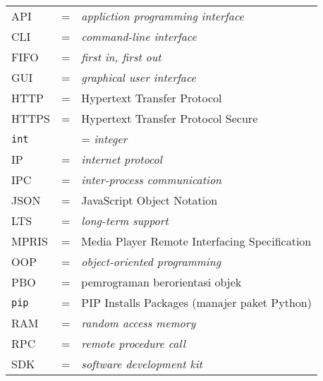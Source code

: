 \begin{tabular}{llp{3in}}
    API & \hspace{1.5cm} = & \textit{appliction programming interface}\\
    CLI & \hspace{1.5cm} = & \textit{command-line interface}\\
    FIFO & \hspace{1.5cm} = & \textit{first in, first out}\\
    GUI & \hspace{1.5cm} = & \textit{graphical user interface}\\
    HTTP & \hspace{1.5cm} = & Hypertext Transfer Protocol\\
    HTTPS & \hspace{1.5cm} = & Hypertext Transfer Protocol Secure\\
    \verb|int| & \hspace{1.5cm} & = \textit{integer}\\
    IP & \hspace{1.5cm} = & \textit{internet protocol}\\
    IPC & \hspace{1.5cm} = & \textit{inter-process communication}\\
    JSON & \hspace{1.5cm} = & JavaScript Object Notation\\
    LTS & \hspace{1.5cm} = & \textit{long-term support}\\
    MPRIS & \hspace{1.5cm} = & Media Player Remote Interfacing Specification\\
    OOP & \hspace{1.5cm} = & \textit{object-oriented programming}\\
    PBO & \hspace{1.5cm} = & pemrograman berorientasi objek\\
    \verb|pip| & \hspace{1.5cm} = & PIP Installs Packages (manajer paket Python)\\
    RAM & \hspace{1.5cm} = & \textit{random access memory}\\
    RPC & \hspace{1.5cm} = & \textit{remote procedure call}\\
    SDK & \hspace{1.5cm} = & \textit{software development kit}\\

\end{tabular}
